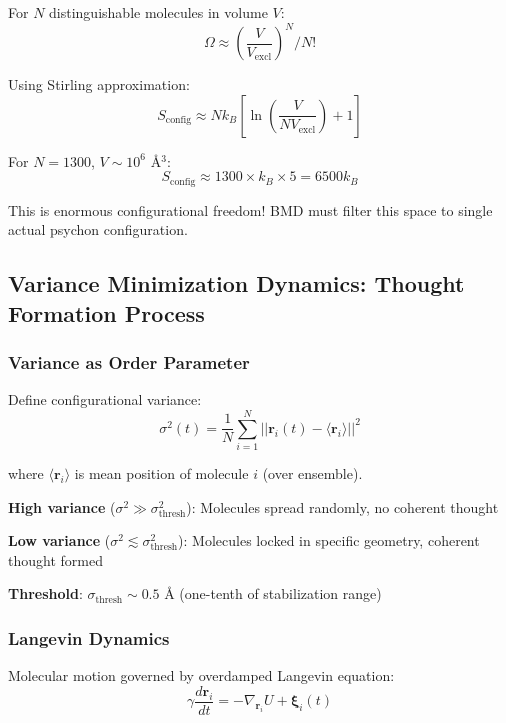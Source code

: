 \documentclass[11pt,onecolumn]{article}
\begin{document}
For $N$ distinguishable molecules in volume $V$:
\begin{equation}
\Omega \approx \left(\frac{V}{V_{\text{excl}}}\right)^N / N!
\end{equation}

Using Stirling approximation:
\begin{equation}
S_{\text{config}} \approx N k_B \left[\ln\left(\frac{V}{N V_{\text{excl}}}\right) + 1\right]
\end{equation}

For $N = 1300$, $V \sim 10^6$ Å$^3$:
\begin{equation}
S_{\text{config}} \approx 1300 \times k_B \times 5 = 6500 k_B
\end{equation}

This is enormous configurational freedom! BMD must filter this space to single actual psychon configuration.

\subsection{Variance Minimization Dynamics: Thought Formation Process}

\subsubsection{Variance as Order Parameter}

Define configurational variance:
\begin{equation}
\sigma^2(t) = \frac{1}{N}\sum_{i=1}^{N} ||\mathbf{r}_i(t) - \langle\mathbf{r}_i\rangle||^2
\end{equation}

where $\langle\mathbf{r}_i\rangle$ is mean position of molecule $i$ (over ensemble).

\textbf{High variance} ($\sigma^2 \gg \sigma_{\text{thresh}}^2$): Molecules spread randomly, no coherent thought

\textbf{Low variance} ($\sigma^2 \lesssim \sigma_{\text{thresh}}^2$): Molecules locked in specific geometry, coherent thought formed

\textbf{Threshold}: $\sigma_{\text{thresh}} \sim 0.5$ Å (one-tenth of stabilization range)

\subsubsection{Langevin Dynamics}

Molecular motion governed by overdamped Langevin equation:
\begin{equation}
\gamma \frac{d\mathbf{r}_i}{dt} = -\nabla_{\mathbf{r}_i} U + \boldsymbol{\xi}_i(t)
\end{equation}
\end{document}
